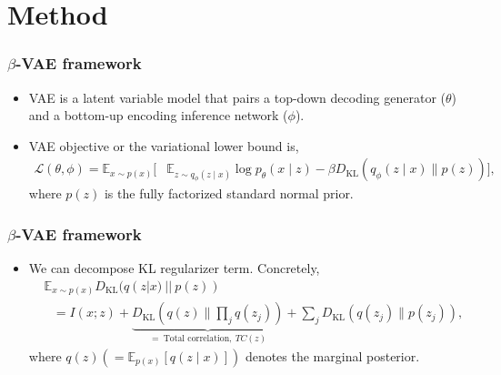 \documentclass[10pt,mathserif]{beamer}
\begin{document}
\section{Method}
\begin{frame}
\frametitle{$\beta$-VAE framework}
\begin{itemize}\itemsep=20pt
\item VAE is a latent variable model that pairs a top-down decoding generator ($\theta$) and a bottom-up encoding inference network ($\phi$).\pause
\item VAE objective or the variational lower bound is,
\begin{align}
\mathcal{L}(\theta,\phi) = \mathbb{E}_{x \sim p(x)} \big[&\mathbb{E}_{z \sim q_\phi(z \mid x)} \log p_\theta(x \mid z)- \beta D_\text{KL}\left(q_\phi(z \mid x) \parallel p(z)\right)\big],\nonumber
\end{align}
where $p(z)$ is the fully factorized standard normal prior.
\end{itemize}
\end{frame}

\begin{frame}
\frametitle{$\beta$-VAE framework}
\begin{itemize}\itemsep=12pt
\item We can decompose KL regularizer term. Concretely,
\begin{align}
&\mathbb{E}_{x \sim p(x)} D_\text{KL}(q(z| x) ~||~ p(z))\nonumber \\
&~~~=I(x;z) + \underbrace{D_\text{KL}(q(z) \parallel \prod_j q(z_j))}_{=~\text{Total correlation},~ TC(z)} + \sum_j D_\text{KL}(q(z_j) \parallel p(z_j)),\nonumber
\end{align}
        where $q(z)(=\mathbb{E}_{p(x)}[q(z\!\mid\!x)])$ denotes the marginal posterior. 
\end{itemize}
\end{frame}
\end{document}
